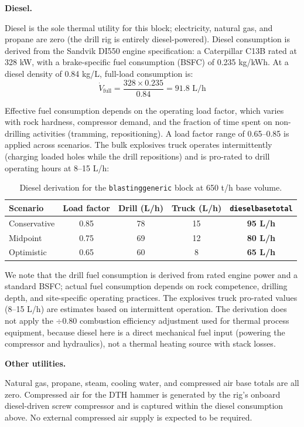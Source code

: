 \documentclass{article}
\renewcommand\_{\textunderscore\allowbreak}
\begin{document}
\medskip
\noindent\textbf{Diesel.}\quad

Diesel is the sole thermal utility for this block; electricity, natural gas, and propane are zero (the drill rig is entirely diesel-powered). Diesel consumption is derived from the Sandvik DI550 engine specification: a Caterpillar C13B rated at 328 kW, with a brake-specific fuel consumption (BSFC) of 0.235 kg/kWh. At a diesel density of 0.84 kg/L, full-load consumption is:
\[
	\dot{V}_{\text{full}} = \frac{328 \times 0.235}{0.84} = 91.8 \text{ L/h}
\]

Effective fuel consumption depends on the operating load factor, which varies with rock hardness, compressor demand, and the fraction of time spent on non-drilling activities (tramming, repositioning). A load factor range of 0.65--0.85 is applied across scenarios. The bulk explosives truck operates intermittently (charging loaded holes while the drill repositions) and is pro-rated to drill operating hours at 8--15 L/h:

\begin{table}[h!]
\caption{Diesel derivation for the \texttt{blasting\_generic} block at 650 t/h base volume.}
\centering
\begin{tabular}{lcccc}
\toprule
\textbf{Scenario} & \textbf{Load factor} & \textbf{Drill (L/h)} & \textbf{Truck (L/h)} & \texttt{diesel\_base\_total} \\
\midrule
Conservative & 0.85 & 78 & 15 & \textbf{95 L/h} \\
Midpoint     & 0.75 & 69 & 12 & \textbf{80 L/h} \\
Optimistic   & 0.65 & 60 &  8 & \textbf{65 L/h} \\
\bottomrule
\end{tabular}
\end{table}

We note that the drill fuel consumption is derived from rated engine power and a standard BSFC; actual fuel consumption depends on rock competence, drilling depth, and site-specific operating practices. The explosives truck pro-rated values (8--15 L/h) are estimates based on intermittent operation. The derivation does not apply the $\div 0.80$ combustion efficiency adjustment used for thermal process equipment, because diesel here is a direct mechanical fuel input (powering the compressor and hydraulics), not a thermal heating source with stack losses.

\medskip
\noindent\textbf{Other utilities.}\quad

Natural gas, propane, steam, cooling water, and compressed air base totals are all zero. Compressed air for the DTH hammer is generated by the rig's onboard diesel-driven screw compressor and is captured within the diesel consumption above. No external compressed air supply is expected to be required.
\end{document}
